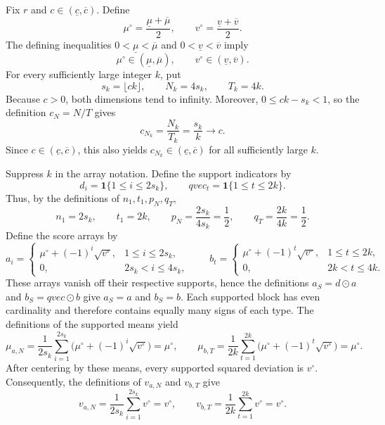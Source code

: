 Fix \(r\) and \(c\in(\underline c,\overline c)\). Define
\[
 \mu^\circ=\frac{\underline\mu+\overline\mu}{2},
 \qquad
 v^\circ=\frac{\underline v+\overline v}{2}.
\]
The defining inequalities \(0<\underline\mu<\overline\mu\) and \(0<\underline v<\overline v\) imply
\[
 \mu^\circ\in(\underline\mu,\overline\mu),
 \qquad
 v^\circ\in(\underline v,\overline v).
\]
For every sufficiently large integer \(k\), put
\[
 s_k=\lfloor ck\rfloor,
 \qquad
 N_k=4s_k,
 \qquad
 T_k=4k.
\]
Because \(c>0\), both dimensions tend to infinity. Moreover, \(0\le ck-s_k<1\), so the definition \(c_N=N/T\) gives
\[
 c_{N_k}=\frac{N_k}{T_k}=\frac{s_k}{k}\longrightarrow c.
\]
Since \(c\in(\underline c,\overline c)\), this also yields \(c_{N_k}\in(\underline c,\overline c)\) for all sufficiently large \(k\).

Suppress \(k\) in the array notation. Define the support indicators by
\[
 d_i=\mathbf 1\{1\le i\le2s_k\},
 \qquad
 qvec_t=\mathbf 1\{1\le t\le2k\}.
\]
Thus, by the definitions of \(n_1,t_1,p_N,q_T\),
\[
 n_1=2s_k,
 \qquad t_1=2k,
 \qquad p_N=\frac{2s_k}{4s_k}=\frac12,
 \qquad q_T=\frac{2k}{4k}=\frac12.
\]
Define the score arrays by
\[
 a_i=
 \begin{cases}
  \mu^\circ+(-1)^i\sqrt{v^\circ},&1\le i\le2s_k,\\
  0,&2s_k<i\le4s_k,
 \end{cases}
 \qquad
 b_t=
 \begin{cases}
  \mu^\circ+(-1)^t\sqrt{v^\circ},&1\le t\le2k,\\
  0,&2k<t\le4k.
 \end{cases}
\]
These arrays vanish off their respective supports, hence the definitions \(a_S=d\odot a\) and \(b_S=qvec\odot b\) give \(a_S=a\) and \(b_S=b\). Each supported block has even cardinality and therefore contains equally many signs of each type. The definitions of the supported means yield
\[
 \mu_{a,N}
 =\frac{1}{2s_k}\sum_{i=1}^{2s_k}
   \bigl(\mu^\circ+(-1)^i\sqrt{v^\circ}\bigr)
 =\mu^\circ,
 \qquad
 \mu_{b,T}
 =\frac{1}{2k}\sum_{t=1}^{2k}
   \bigl(\mu^\circ+(-1)^t\sqrt{v^\circ}\bigr)
 =\mu^\circ.
\]
After centering by these means, every supported squared deviation is \(v^\circ\). Consequently, the definitions of \(v_{a,N}\) and \(v_{b,T}\) give
\[
 v_{a,N}
 =\frac{1}{2s_k}\sum_{i=1}^{2s_k}v^\circ
 =v^\circ,
 \qquad
 v_{b,T}
 =\frac{1}{2k}\sum_{t=1}^{2k}v^\circ
 =v^\circ.
\]

